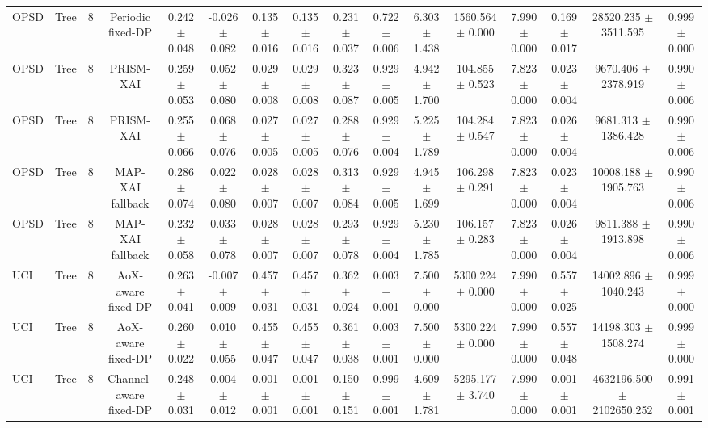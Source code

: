 \begin{tabular}{lccccccccccccccc}
OPSD & Tree & 8 & Periodic fixed-DP & 0.242 $\pm$ 0.048 & -0.026 $\pm$ 0.082 & 0.135 $\pm$ 0.016 & 0.135 $\pm$ 0.016 & 0.231 $\pm$ 0.037 & 0.722 $\pm$ 0.006 & 6.303 $\pm$ 1.438 & 1560.564 $\pm$ 0.000 & 7.990 $\pm$ 0.000 & 0.169 $\pm$ 0.017 & 28520.235 $\pm$ 3511.595 & 0.999 $\pm$ 0.000 \\
OPSD & Tree & 8 & PRISM-XAI & 0.259 $\pm$ 0.053 & 0.052 $\pm$ 0.080 & 0.029 $\pm$ 0.008 & 0.029 $\pm$ 0.008 & 0.323 $\pm$ 0.087 & 0.929 $\pm$ 0.005 & 4.942 $\pm$ 1.700 & 104.855 $\pm$ 0.523 & 7.823 $\pm$ 0.000 & 0.023 $\pm$ 0.004 & 9670.406 $\pm$ 2378.919 & 0.990 $\pm$ 0.006 \\
OPSD & Tree & 8 & PRISM-XAI & 0.255 $\pm$ 0.066 & 0.068 $\pm$ 0.076 & 0.027 $\pm$ 0.005 & 0.027 $\pm$ 0.005 & 0.288 $\pm$ 0.076 & 0.929 $\pm$ 0.004 & 5.225 $\pm$ 1.789 & 104.284 $\pm$ 0.547 & 7.823 $\pm$ 0.000 & 0.026 $\pm$ 0.004 & 9681.313 $\pm$ 1386.428 & 0.990 $\pm$ 0.006 \\
OPSD & Tree & 8 & MAP-XAI fallback & 0.286 $\pm$ 0.074 & 0.022 $\pm$ 0.080 & 0.028 $\pm$ 0.007 & 0.028 $\pm$ 0.007 & 0.313 $\pm$ 0.084 & 0.929 $\pm$ 0.005 & 4.945 $\pm$ 1.699 & 106.298 $\pm$ 0.291 & 7.823 $\pm$ 0.000 & 0.023 $\pm$ 0.004 & 10008.188 $\pm$ 1905.763 & 0.990 $\pm$ 0.006 \\
OPSD & Tree & 8 & MAP-XAI fallback & 0.232 $\pm$ 0.058 & 0.033 $\pm$ 0.078 & 0.028 $\pm$ 0.007 & 0.028 $\pm$ 0.007 & 0.293 $\pm$ 0.078 & 0.929 $\pm$ 0.004 & 5.230 $\pm$ 1.785 & 106.157 $\pm$ 0.283 & 7.823 $\pm$ 0.000 & 0.026 $\pm$ 0.004 & 9811.388 $\pm$ 1913.898 & 0.990 $\pm$ 0.006 \\
UCI & Tree & 8 & AoX-aware fixed-DP & 0.263 $\pm$ 0.041 & -0.007 $\pm$ 0.009 & 0.457 $\pm$ 0.031 & 0.457 $\pm$ 0.031 & 0.362 $\pm$ 0.024 & 0.003 $\pm$ 0.001 & 7.500 $\pm$ 0.000 & 5300.224 $\pm$ 0.000 & 7.990 $\pm$ 0.000 & 0.557 $\pm$ 0.025 & 14002.896 $\pm$ 1040.243 & 0.999 $\pm$ 0.000 \\
UCI & Tree & 8 & AoX-aware fixed-DP & 0.260 $\pm$ 0.022 & 0.010 $\pm$ 0.055 & 0.455 $\pm$ 0.047 & 0.455 $\pm$ 0.047 & 0.361 $\pm$ 0.038 & 0.003 $\pm$ 0.001 & 7.500 $\pm$ 0.000 & 5300.224 $\pm$ 0.000 & 7.990 $\pm$ 0.000 & 0.557 $\pm$ 0.048 & 14198.303 $\pm$ 1508.274 & 0.999 $\pm$ 0.000 \\
UCI & Tree & 8 & Channel-aware fixed-DP & 0.248 $\pm$ 0.031 & 0.004 $\pm$ 0.012 & 0.001 $\pm$ 0.001 & 0.001 $\pm$ 0.001 & 0.150 $\pm$ 0.151 & 0.999 $\pm$ 0.001 & 4.609 $\pm$ 1.781 & 5295.177 $\pm$ 3.740 & 7.990 $\pm$ 0.000 & 0.001 $\pm$ 0.001 & 4632196.500 $\pm$ 2102650.252 & 0.991 $\pm$ 0.001 \\

\end{tabular}
